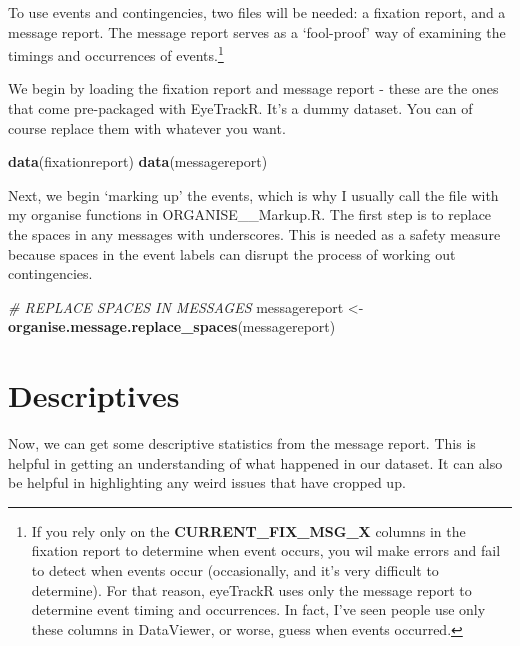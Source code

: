 \documentclass[]{book}
\newenvironment{Shaded}{\begin{snugshade}}{\end{snugshade}}
\newcommand{\CommentTok}[1]{\textcolor[rgb]{0.56,0.35,0.01}{\textit{#1}}}
\newcommand{\KeywordTok}[1]{\textcolor[rgb]{0.13,0.29,0.53}{\textbf{#1}}}
\newcommand{\NormalTok}[1]{#1}
\newcommand{\StringTok}[1]{\textcolor[rgb]{0.31,0.60,0.02}{#1}}
\let\rmarkdownfootnote\footnote%
\def\footnote{\protect\rmarkdownfootnote}
\begin{document}
To use events and contingencies, two files will be needed: a fixation report, and a message report. The message report serves as a `fool-proof' way of examining the timings and occurrences of events.\footnote{If you rely only on the \textbf{CURRENT\_FIX\_MSG\_X} columns in the fixation report to determine when event occurs, you wil make errors and fail to detect when events occur (occasionally, and it's very difficult to determine). For that reason, eyeTrackR uses only the message report to determine event timing and occurrences. In fact, I've seen people use only these columns in DataViewer, or worse, guess when events occurred.}

We begin by loading the fixation report and message report - these are the ones that come pre-packaged with EyeTrackR. It's a dummy dataset. You can of course replace them with whatever you want.

\begin{Shaded}
\begin{Highlighting}[]
\KeywordTok{data}\NormalTok{(fixationreport)}
\KeywordTok{data}\NormalTok{(messagereport)}
\end{Highlighting}
\end{Shaded}

Next, we begin `marking up' the events, which is why I usually call the file with my organise functions in ORGANISE\_\_Markup.R. The first step is to replace the spaces in any messages with underscores. This is needed as a safety measure because spaces in the event labels can disrupt the process of working out contingencies.

\begin{Shaded}
\begin{Highlighting}[]
\CommentTok{# REPLACE SPACES IN MESSAGES}
\NormalTok{messagereport <-}\StringTok{ }\KeywordTok{organise.message.replace_spaces}\NormalTok{(messagereport)}
\end{Highlighting}
\end{Shaded}

\hypertarget{descriptives}{%
\section{Descriptives}\label{descriptives}}

Now, we can get some descriptive statistics from the message report. This is helpful in getting an understanding of what happened in our dataset. It can also be helpful in highlighting any weird issues that have cropped up.
\end{document}
